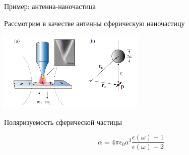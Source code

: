 \documentclass[9pt, compress, xcolor=table]{beamer}
\begin{document}
\begin{frame}{Пример: антенна-наночастица}

Рассмотрим в качестве антенны сферическую наночастицу

\begin{center}
\includegraphics[width=7cm]{optant_5}
\end{center}

 Поляризуемость сферической частицы

\begin{equation*}
\alpha=4 \pi \epsilon_0 a^3 \frac{\epsilon(\omega)-1}{\epsilon(\omega)+2}
\end{equation*}
\end{frame}
\end{document}
